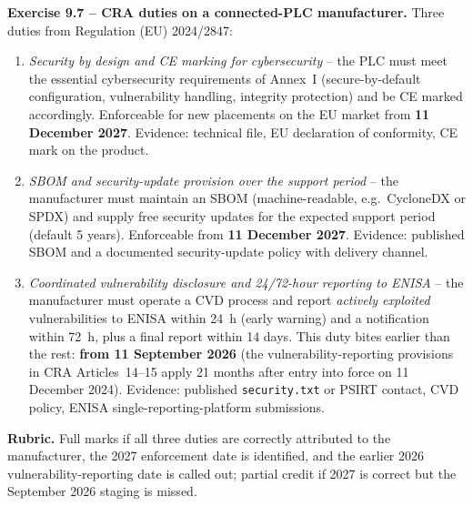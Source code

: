 \documentclass[11pt,a4paper]{article}
\begin{document}
\begin{solutionbox}
\textbf{Exercise 9.7 -- CRA duties on a connected-PLC manufacturer.}
Three duties from Regulation (EU) 2024/2847:
\begin{enumerate}
  \item \emph{Security by design and CE marking for cybersecurity} -- the PLC must meet the essential cybersecurity requirements of Annex~I (secure-by-default configuration, vulnerability handling, integrity protection) and be CE marked accordingly. Enforceable for new placements on the EU market from \textbf{11 December 2027}. Evidence: technical file, EU declaration of conformity, CE mark on the product.
  \item \emph{SBOM and security-update provision over the support period} -- the manufacturer must maintain an SBOM (machine-readable, e.g.\ CycloneDX or SPDX) and supply free security updates for the expected support period (default 5 years). Enforceable from \textbf{11 December 2027}. Evidence: published SBOM and a documented security-update policy with delivery channel.
  \item \emph{Coordinated vulnerability disclosure and 24/72-hour reporting to ENISA} -- the manufacturer must operate a CVD process and report \emph{actively exploited} vulnerabilities to ENISA within 24~h (early warning) and a notification within 72~h, plus a final report within 14 days. This duty bites earlier than the rest: \textbf{from 11 September 2026} (the vulnerability-reporting provisions in CRA Articles~14--15 apply 21 months after entry into force on 11 December 2024). Evidence: published \texttt{security.txt} or PSIRT contact, CVD policy, ENISA single-reporting-platform submissions.
\end{enumerate}
\textbf{Rubric.} Full marks if all three duties are correctly attributed to the manufacturer, the 2027 enforcement date is identified, and the earlier 2026 vulnerability-reporting date is called out; partial credit if 2027 is correct but the September 2026 staging is missed.
\end{solutionbox}
\end{document}

